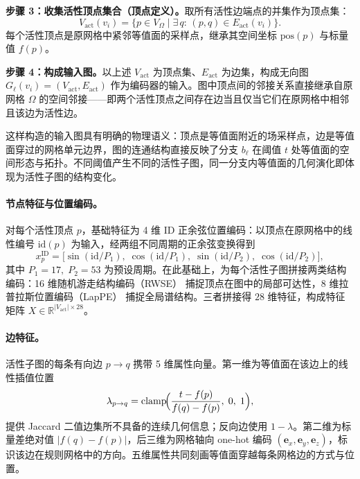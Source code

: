 \documentclass[twocolumn, a4paper, 10pt]{article}
\begin{document}
\noindent\textbf{步骤 3：收集活性顶点集合（顶点定义）。}取所有活性边端点的并集作为顶点集：
\begin{equation}
V_{\mathrm{act}}(v_i)=\bigl\{p\in V_\Omega \;\big|\; \exists\, q:\,(p,q)\in E_{\mathrm{act}}(v_i)\bigr\}.
\label{eq:active-verts}
\end{equation}
每个活性顶点是原网格中紧邻等值面的采样点，继承其空间坐标 $\mathrm{pos}(p)$ 与标量值 $f(p)$。

\noindent\textbf{步骤 4：构成输入图。}以上述 $V_{\mathrm{act}}$ 为顶点集、$E_{\mathrm{act}}$ 为边集，构成无向图 $G_\ell(v_i)=(V_{\mathrm{act}}, E_{\mathrm{act}})$ 作为编码器的输入。图中顶点间的邻接关系直接继承自原网格 $\Omega$ 的空间邻接——即两个活性顶点之间存在边当且仅当它们在原网格中相邻且该边为活性边。

这样构造的输入图具有明确的物理语义：顶点是等值面附近的场采样点，边是等值面穿过的网格单元边界，图的连通结构直接反映了分支 $b_\ell$ 在阈值 $t$ 处等值面的空间形态与拓扑。不同阈值产生不同的活性子图，同一分支内等值面的几何演化即体现为活性子图的结构变化。

\paragraph{节点特征与位置编码。}对每个活性顶点 $p$，基础特征为 4 维 ID 正余弦位置编码：以顶点在原网格中的线性编号 $\mathrm{id}(p)$ 为输入，经两组不同周期的正余弦变换得到
\[
x^{\mathrm{ID}}_p = \bigl[\sin(\mathrm{id}/P_1),\;\cos(\mathrm{id}/P_1),\;\sin(\mathrm{id}/P_2),\;\cos(\mathrm{id}/P_2)\bigr],
\]
其中 $P_1{=}17,\;P_2{=}53$ 为预设周期。在此基础上，为每个活性子图拼接两类结构编码：16 维随机游走结构编码（RWSE）\cite{dwivedi_rwse_2022} 捕捉顶点在图中的局部可达性，8 维拉普拉斯位置编码（LapPE）\cite{dwivedi_benchmarking_2020} 捕捉全局谱结构。三者拼接得 $28$ 维特征，构成特征矩阵 $X\in\mathbb{R}^{|V_{\mathrm{act}}|\times 28}$。

\paragraph{边特征。}活性子图的每条有向边 $p\to q$ 携带 5 维属性向量。第一维为等值面在该边上的线性插值位置
\begin{equation}
\lambda_{p\to q} = \mathrm{clamp}\!\Bigl(\frac{t - f(p)}{f(q) - f(p)},\;0,\;1\Bigr),
\label{eq:lambda-edge}
\end{equation}
提供 Jaccard 二值边集所不具备的连续几何信息；反向边使用 $1{-}\lambda$。第二维为标量差绝对值 $|f(q){-}f(p)|$，后三维为网格轴向 one-hot 编码 $(\mathbf{e}_x,\mathbf{e}_y,\mathbf{e}_z)$，标识该边在规则网格中的方向。五维属性共同刻画等值面穿越每条网格边的方式与位置。
\end{document}
